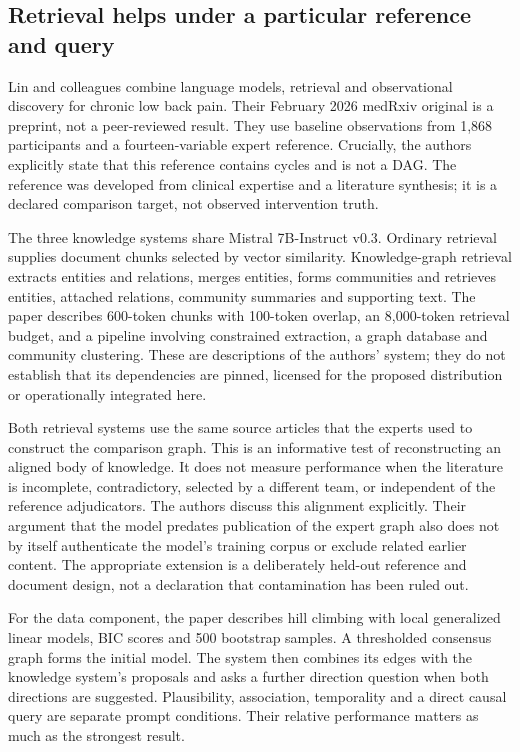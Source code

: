 \subsection{Retrieval helps under a particular reference and query}
\label{exec22:domain-retrieval}

Lin and colleagues combine language models, retrieval and observational discovery
for chronic low back pain. Their February 2026 medRxiv original is a preprint,
not a peer-reviewed result. They use baseline observations from 1,868 participants
and a fourteen-variable expert reference. Crucially, the authors explicitly state
that this reference contains cycles and is not a DAG. The reference was developed
from clinical expertise and a literature synthesis; it is a declared comparison
target, not observed intervention truth. \cite{exec22_domain_lin}

The three knowledge systems share Mistral 7B-Instruct v0.3. Ordinary retrieval
supplies document chunks selected by vector similarity. Knowledge-graph retrieval
extracts entities and relations, merges entities, forms communities and retrieves
entities, attached relations, community summaries and supporting text. The paper
describes 600-token chunks with 100-token overlap, an 8,000-token retrieval budget,
and a pipeline involving constrained extraction, a graph database and community
clustering. These are descriptions of the authors' system; they do not establish
that its dependencies are pinned, licensed for the proposed distribution or
operationally integrated here. \cite{exec22_domain_lin}

Both retrieval systems use the same source articles that the experts used to
construct the comparison graph. This is an informative test of reconstructing
an aligned body of knowledge. It does not measure performance when the literature
is incomplete, contradictory, selected by a different team, or independent of the
reference adjudicators. The authors discuss this alignment explicitly. Their
argument that the model predates publication of the expert graph also does not
by itself authenticate the model's training corpus or exclude related earlier
content. The appropriate extension is a deliberately held-out reference and
document design, not a declaration that contamination has been ruled out.

For the data component, the paper describes hill climbing with local generalized
linear models, BIC scores and 500 bootstrap samples. A thresholded consensus graph
forms the initial model. The system then combines its edges with the knowledge
system's proposals and asks a further direction question when both directions
are suggested. Plausibility, association, temporality and a direct causal query
are separate prompt conditions. Their relative performance matters as much as
the strongest result. \cite{exec22_domain_lin}

